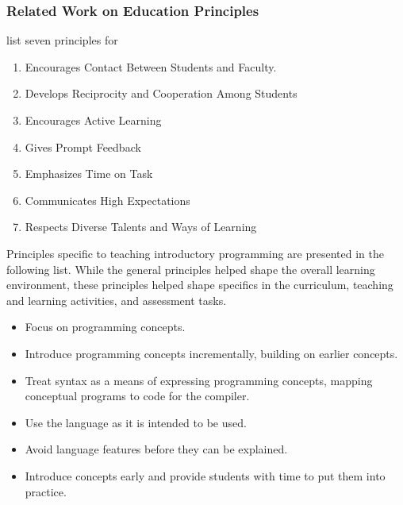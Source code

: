 

\subsubsection{Related Work on Education Principles} %
\label{ssub:related_work_on_education_principles}



\citet{Chickering:1987} list seven principles for 
\begin{enumerate}
	\item Encourages Contact Between Students and Faculty.
	\item Develops Reciprocity and Cooperation Among Students
	\item Encourages Active Learning
	\item Gives Prompt Feedback
	\item Emphasizes Time on Task
	\item Communicates High Expectations
	\item Respects Diverse Talents and Ways of Learning
\end{enumerate}








Principles specific to teaching introductory programming are presented in the following list. While the general principles helped shape the overall learning environment, these principles helped shape specifics in the curriculum, teaching and learning activities, and assessment tasks.

\begin{itemize}
	\item Focus on programming concepts.
	\item Introduce programming concepts incrementally, building on earlier concepts.
	\item Treat syntax as a means of expressing programming concepts, mapping conceptual programs to code for the compiler.
	\item Use the language as it is intended to be used.
	\item Avoid language features before they can be explained.
	\item Introduce concepts early and provide students with time to put them into practice.
\end{itemize}

